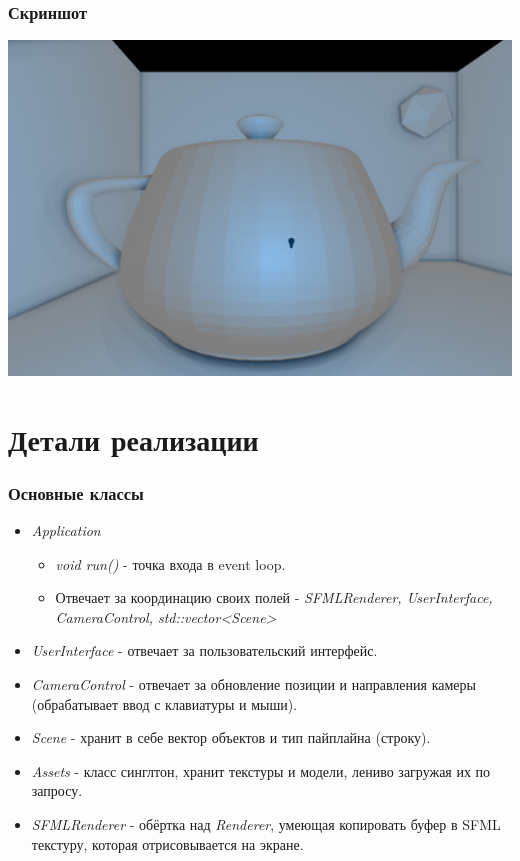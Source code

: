 \documentclass{beamer}
\begin{document}
\begin{frame}
	\frametitle{Скриншот}
	\begin{center}
		\includegraphics[scale=0.28]{scene7.png} 
	\end{center}
\end{frame}

\section{Детали реализации}
\begin{frame}
	\frametitle{Основные классы}
	
	\begin{itemize}
		\item<1-> \textit{Application}
		\begin{itemize}
			\item<1-> \textit{void run()} - точка входа в event loop.
			\item<1-> Отвечает за координацию своих полей - \textit{SFMLRenderer, UserInterface, CameraControl, std::vector<Scene>}
		\end{itemize}
		\item<1-> \textit{UserInterface} - отвечает за пользовательский интерфейс.
		\item<1-> \textit{CameraControl} - отвечает за обновление позиции и направления камеры (обрабатывает ввод с клавиатуры и мыши).
		\item<1-> \textit{Scene} - хранит в себе вектор объектов и тип пайплайна (строку).
		\item<1-> \textit{Assets} - класс синглтон, хранит текстуры и модели, лениво загружая их по запросу.
		\item<1-> \textit{SFMLRenderer} - обёртка над \textit{Renderer}, умеющая копировать буфер в SFML текстуру, которая отрисовывается на экране.
	\end{itemize}
\end{frame}
\end{document}

